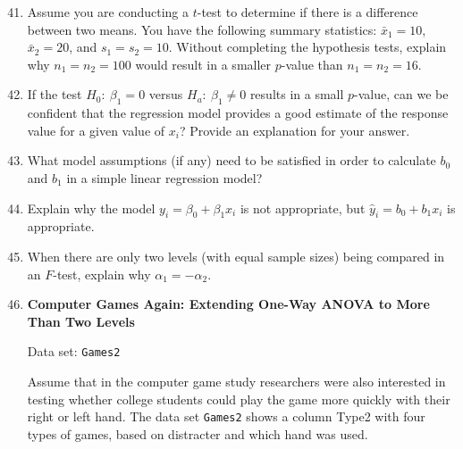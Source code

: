 \documentclass[
]{report}
\begin{document}
\begin{enumerate}
  \setcounter{enumi}{40}
  \item Assume you are conducting a $\scriptstyle t$-test to determine if there is a difference between two means. You have the following summary statistics: $\scriptstyle \bar{x}_1 = 10$, $\scriptstyle \bar{x}_2 = 20$, and $\scriptstyle s_1 = s_2 = 10$. Without completing the hypothesis tests, explain why $\scriptstyle n_1 = n_2 = 100$ would result in a smaller $\scriptstyle p$-value than $\scriptstyle n_1 = n_2 = 16$.

  \item If the test $\scriptstyle H_0:\  \beta_1 = 0$ versus $\scriptstyle H_a:\  \beta_1 \ne 0$ results in a small $\scriptstyle p$-value, can we be confident that the regression model provides a good estimate of the response value for a given value of $\scriptstyle x_i$? Provide an explanation for your answer.

  \item What model assumptions (if any) need to be satisfied in order to calculate $\scriptstyle b_0$ and $\scriptstyle b_1$ in a simple linear regression model?

  \item Explain why the model $\scriptstyle y_i = \beta_0 + \beta_1 x_i$ is not appropriate, but $\scriptstyle \hat{y}_i = b_0 + b_1 x_i$ is appropriate.

  \item When there are only two levels (with equal sample sizes) being compared in an $\scriptstyle F$-test, explain why $\scriptstyle \alpha_1 = -\alpha_2$.

  \item \textbf{Computer Games Again: Extending One-Way ANOVA to More Than Two Levels}

Data set: \texttt{Games2}

Assume that in the computer game study researchers were also interested in testing whether college students could play the game more quickly with their right or left hand. The data set \texttt{Games2} shows a column Type2 with four types of games, based on distracter and which hand was used.


\end{enumerate}
\end{document}
